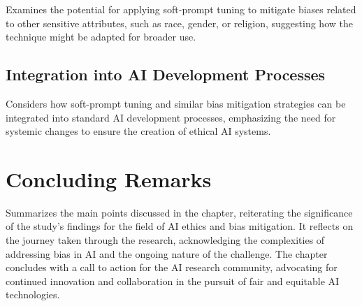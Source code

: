 Examines the potential for applying soft-prompt tuning to mitigate biases related to other sensitive attributes, such as race, gender, or religion, suggesting how the technique might be adapted for broader use.

\subsection{Integration into AI Development Processes}

Considers how soft-prompt tuning and similar bias mitigation strategies can be integrated into standard AI development processes, emphasizing the need for systemic changes to ensure the creation of ethical AI systems.

\section{Concluding Remarks}

Summarizes the main points discussed in the chapter, reiterating the significance of the study's findings for the field of AI ethics and bias mitigation. It reflects on the journey taken through the research, acknowledging the complexities of addressing bias in AI and the ongoing nature of the challenge. The chapter concludes with a call to action for the AI research community, advocating for continued innovation and collaboration in the pursuit of fair and equitable AI technologies.